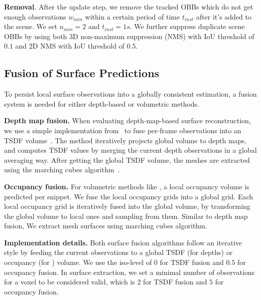 
\noindent \textbf{Removal}. After the update step, we remove the tracked OBBs which do not get enough observations $w_{min}$ within a certain period of time $t_{inst}$ after it’s added to the scene. We set $n_{min}=2$ and $t_{inst} =1s$.  
We further suppress duplicate scene OBBs by using both 3D non-maximum suppression (NMS) with IoU threshold of $0.1$ and 2D NMS with IoU threshold of $0.5$.

\subsection{Fusion of Surface Predictions}
To persist local surface observations into a globally consistent estimation, a fusion system is needed for either depth-based or volumetric methods.

\noindent \textbf{Depth map fusion.} When evaluating depth-map-based surface reconstruction, we use a simple implementation from~\cite{zeng20163dmatch} to fuse per-frame observations into an TSDF volume~\cite{newcombe2011kinectfusion}. The method iteratively projects global volume to depth maps, and computes TSDF values by merging the current depth observations in a global averaging way. After getting the global TSDF volume, the meshes are extracted using the marching cubes algorithm~\cite{lorensen1998marching}. 

\noindent \textbf{Occupancy fusion.} For volumetric methods like \EFMmodel{}, a local occupancy volume is predicted per snippet. We fuse the local occupancy grids into a global grid. Each local occupancy grid is iteratively fused into the global volume, by transforming the global volume to local ones and sampling from them. Similar to depth map fusion, We extract mesh surfaces using marching cubes algorithm.

\noindent \textbf{Implementation details.} Both surface fusion algorithms follow an iterative style by feeding the current observations to a global TSDF (for depths) or occupancy (for \EFMmodel{}) volume. We use the iso-level of $0$ for TSDF fusion and $0.5$ for occupancy fusion. In surface extraction, we set a minimal number of observations for a voxel to be considered valid, which is $2$ for TSDF fusion and $5$ for occupancy fusion.

